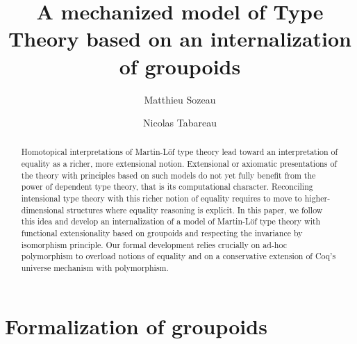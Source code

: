 \documentclass[runningheads,a4paper]{llncs}
\begin{document}
\mainmatter  %

\title{A mechanized model of Type Theory based on an
  internalization of groupoids}

\author{Matthieu Sozeau \and Nicolas Tabareau}

\date{}



\def\mathrm#1{#1}

\maketitle

\begin{abstract}
  Homotopical interpretations of Martin-Löf type theory lead toward an
  interpretation of equality as a richer, more extensional
  notion. Extensional or axiomatic presentations of the theory with
  principles based on such models do not yet fully benefit from the
  power of dependent type theory, that is its computational
  character. Reconciling intensional type theory with this richer
  notion of equality requires to move to higher-dimensional structures
  where equality reasoning is explicit. In this paper, we follow this
  idea and develop an internalization of a model of Martin-Löf type
  theory with functional extensionality based on groupoids and respecting
  the invariance by isomorphism principle.
  Our formal development relies crucially on ad-hoc polymorphism to
  overload notions of equality and on a conservative extension of
  Coq's universe mechanism with polymorphism.
\end{abstract}







\section{Formalization of groupoids}
\label{sec:formalization}
\end{document}
